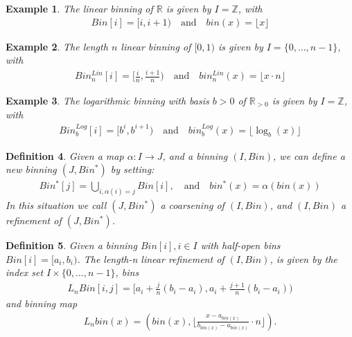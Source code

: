\documentclass{article}
\theoremstyle{plain}
\newtheorem{definition}{Definition}[section]
\newtheorem{example}[definition]{Example}
\theoremstyle{remark}
\newcommand{\IR}{\mathbb{R}}
\newcommand{\IZ}{\mathbb{Z}}
\newcommand{\Union}{\bigcup}
\newcommand{\qtext}[1]{\quad\text{#1}\quad} %
\newcommand{\ra}{\rightarrow}
\newcommand{\floor}[1]{\lfloor#1\rfloor}
\begin{document}
\begin{example}
  The linear binning of $\IR$ is given by $I = \IZ$, with
  \begin{align*}
    Bin[i] = [i, i+1)  \qtext{and} bin(x)=\floor{x}
  \end{align*}
\end{example}

\begin{example}
  The length $n$ linear binning of $[0,1)$ is given by $I = \{0, \dots, n-1\}$, with
    \begin{align*}
      Bin^{Lin}_n[i]   = [ \frac{i}{n}, \frac{i+1}{n} )
      \qtext{and}
      bin^{Lin}_n(x) = \floor{x \cdot n}
    \end{align*}
\end{example}

\begin{example}
  The logarithmic binning with basis $b > 0$ of $\IR_{>0}$ is given by $I=\IZ$, with
  \begin{align*}
    Bin^{Log}_b[i] = [b^i, b^{i+1})
    \qtext{and}
    bin^{Log}_b(x)=\floor{\log_b(x)}
  \end{align*}
\end{example}

\begin{definition}\label{ref}
  Given a map $\alpha: I \ra J$, and a binning $(I, Bin)$, we can define a new binning
  $(J, Bin^*)$ by setting:
  \begin{align*}
    Bin^*[j] = \Union_{i, \alpha(i) = j} Bin[i], \qtext{and} bin^*(x) = \alpha(bin(x))
  \end{align*}
  In this situation we call $(J, Bin^*)$ a coarsening of $(I, Bin)$, and $(I, Bin)$ a refinement of $(J, Bin^*)$.
\end{definition}

\begin{definition}\label{lref}
  Given a binning $Bin[i], i\in I$ with half-open bins $Bin[i] = [a_i, b_i)$.
  The length-n linear refinement of $(I, Bin)$, is given by the index set $I \times \{0,\dots, n-1\}$,
  bins
  \begin{align*}
    L_nBin[i,j] = [ a_i + \frac{j}{n}(b_i - a_i), a_i + \frac{j+1}{n}(b_i - a_i) )
  \end{align*}
  and binning map
  \begin{align*}
    L_nbin(x) = ( bin(x), \floor{\frac{x - a_{bin(x)}}{b_{bin(x)} - a_{bin(x)}} \cdot n } ).
  \end{align*}
\end{definition}
\end{document}
